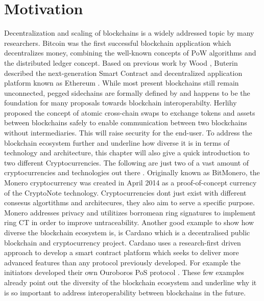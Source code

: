 \section{Motivation}
\label{sec:intro:motivation}
Decentralization and scaling of blockchains is a widely addressed topic by
many researchers. Bitcoin \cite{nakamoto2008peer} was the first successful blockchain application
which decentralizes money, combining the well-known concepts of \ac{PoW} algorithms and the distributed ledger concept. Based on previous work
by Wood \cite{wood2014ethereum}, Buterin described the next-generation Smart Contract and decentralized
application platform known as Ethereum \cite{buterin2013ethereum} \cite{buterin2014ethereum}. While most present
blockchains still remain unconnected, pegged sidechains are formally defined
by \cite{back2014enabling} and happens to be the foundation for many proposals towards blockchain
interoperabilty. Herlihy proposed the concept of atomic cross-chain
swaps to exchange tokens and assets between blockchains safely \cite{herlihy2018atomic}
to enable communication between two blockchains without intermediaries. This will raise security for the end-user.
To address the blockchain ecosystem further and underline how diverse it is in terms of technology and architecture, this chapter will also give a quick introduction to two different Cryptocurrencies. The following are just two of a vast amount of cryptocurrencies and technologies out there .
Originally known as BitMonero, the Monero cryptocurrency was created in April 2014 \cite{alonso2020zero} as a proof-of-concept currency of the CryptoNote \cite{van2013cryptonote} technology.
Cryptocurrencies dont just exist with different consesus algortithms and architecures, they also aim to serve a specific purpose. Monero addresses privacy and utilitizes borromean ring signatures
\cite{maxwell2015borromean} to implement ring \ac{CT} \cite{noether2016ring} in order to improve untraceability.
Another good example to show how diverse the blockchain ecosystem is, is Cardano which is a decentralised public blockchain and cryptocurrency project. Cardano uses a research-first driven approach to develop a smart contract platform which seeks to deliver more advanced features than any protocol previously developed. For example the initiators developed their own Ouroboros \ac{PoS} protocol \cite{kiayias2017ouroboros}. These few examples already point out the diversity of the blockchain ecosystem and underline why it is so important to address interoperability between blockchains in the future.




